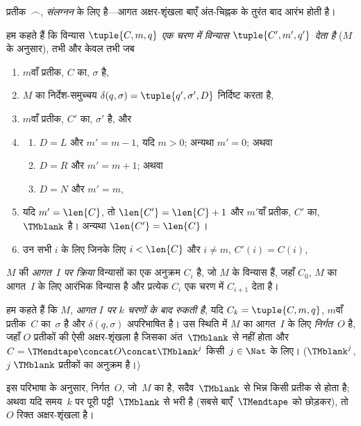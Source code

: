 \documentclass[../../../include/open-logic-section]{subfiles}
\begin{document}
\begin{explain}
प्रतीक~$\frown$, \emph{संलग्नन} के लिए है---आगत अक्षर-शृंखला बाएँ
अंत-चिह्नक के तुरंत बाद आरंभ होती है।
\end{explain}

\begin{defn}
हम कहते हैं कि विन्यास $\tuple{C, m, q}$ \emph{एक चरण में विन्यास
$\tuple{C', m', q'}$ देता है} ($M$ के अनुसार), तभी और केवल तभी जब
\begin{enumerate}
\item $m$वाँ प्रतीक, $C$ का, $\sigma$ है,
\item $M$ का निर्देश-समुच्चय $\delta(q, \sigma) =
  \tuple{q', \sigma', D}$ निर्दिष्ट करता है,
\item $m$वाँ प्रतीक, $C'$ का, $\sigma'$ है, और
\item
\begin{enumerate}
\item $D = L$ और $m' = m - 1$, यदि $m>0$; अन्यथा $m'=0$; अथवा
\item $D = R$ और $m' = m + 1$; अथवा
\item $D = N$ और $m' = m$,
\end{enumerate}
\item यदि $m' = \len{C}$, तो $\len{C'} = \len{C} + 1$ और $m'$वाँ
  प्रतीक, $C'$ का,~$\TMblank$ है। अन्यथा $\len{C'}=\len{C}$।
\item उन सभी $i$ के लिए जिनके लिए $i < \len{C}$ और $i \neq m$,
  $C'(i) = C(i)$,
\end{enumerate}
\end{defn}

\begin{defn}
$M$ की \emph{आगत~$I$ पर क्रिया} विन्यासों का एक अनुक्रम $C_i$ है, जो
$M$ के विन्यास हैं, जहाँ $C_0$, $M$ का आगत~$I$ के लिए आरंभिक विन्यास
है और प्रत्येक $C_i$ एक चरण में $C_{i+1}$ देता है।

हम कहते हैं कि $M$, \emph{आगत $I$ पर $k$ चरणों के बाद रुकती है}, यदि
$C_k =
\tuple{C, m, q}$, $m$वाँ प्रतीक~$C$ का~$\sigma$ है और $\delta(q,
\sigma)$ अपरिभाषित है। उस स्थिति में $M$ का आगत~$I$ के लिए
\emph{निर्गत}~$O$ है, जहाँ $O$ प्रतीकों की ऐसी अक्षर-शृंखला है जिसका
अंत~$\TMblank$ से नहीं होता और
$C = \TMendtape \concat O \concat \TMblank^j$ किसी~$j \in \Nat$ के
लिए। ($\TMblank^j$, $j$
$\TMblank$ प्रतीकों का अनुक्रम है।)
\end{defn}

\begin{explain}
इस परिभाषा के अनुसार, निर्गत~$O$, जो~$M$ का है, सदैव~$\TMblank$ से भिन्न
किसी प्रतीक से होता है; अथवा यदि समय~$k$ पर पूरी पट्टी~$\TMblank$ से
भरी है (सबसे बाएँ~$\TMendtape$ को छोड़कर), तो $O$ रिक्त अक्षर-शृंखला
है।
\end{explain}
\end{document}
